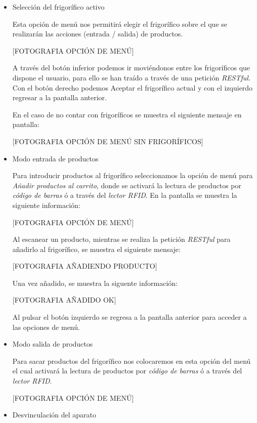 \begin{itemize}

    \item Selección del frigorífico activo

        Esta opción de menú nos permitirá elegir el frigorífico sobre el que se realizarán las acciones (entrada / salida) de productos.

        [FOTOGRAFIA OPCIÓN DE MENÚ]

        A través del botón inferior podemos ir moviéndonos entre los frigoríficos que dispone el usuario, para ello se han traído a través de una petición \emph{RESTful}. Con el botón derecho podemos Aceptar el frigorífico actual y con el izquierdo regresar a la pantalla anterior.

        En el caso de no contar con frigoríficos se muestra el siguiente mensaje en pantalla:

        [FOTOGRAFIA OPCIÓN DE MENÚ SIN FRIGORÍFICOS]

    \item Modo entrada de productos

        Para introducir productos al frigorífico seleccionamos la opción de menú para \emph{Añadir productos al carrito}, donde se activará la lectura de productos por \emph{código de barras} ó a través del \emph{lector RFID}. En la pantalla se muestra la siguiente información:

        [FOTOGRAFIA OPCIÓN DE MENÚ]

        Al escanear un producto, mientras se realiza la petición \emph{RESTful} para añadirlo al frigorífico, se muestra el siguiente mensaje:

        [FOTOGRAFIA AÑADIENDO PRODUCTO]

        Una vez añadido, se muestra la siguente información:

        [FOTOGRAFIA AÑADIDO OK]

        Al pulsar el botón izquierdo se regresa a la pantalla anterior para acceder a las opciones de menú.

    \item Modo salida de productos

        Para sacar productos del frigorífico nos colocaremos en esta opción del menú el cual activará la lectura de productos por \emph{código de barras} ó a través del \emph{lector RFID}.

        [FOTOGRAFIA OPCIÓN DE MENÚ]

    \item Desvinculación del aparato


\end{itemize}
